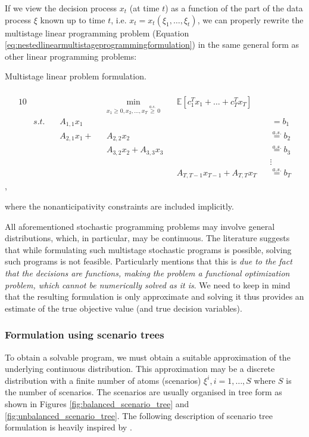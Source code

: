 If we view the decision process $x_t$ (at time $t$) as a function of the part of the data process $\xi$ known up to time $t$, i.e. $x_t=x_t(\xi_1,\dots,\xi_t)$, we can properly rewrite the multistage linear programming problem (Equation \ref{eq:nestedlinearmultistageprogrammingformulation}) in the same general form as other linear programming problems:
\begin{defn}
{Multistage linear problem formulation. \\ \cite[Ch. 1, p. 22]{stochasticprogrammingbible}} \\
\footnotesize
\begin{alignat}{10}
\label{eq:staircaselinearprogrammingformulation}
& &&  && \underset{x_1 \geq 0, x_2,\dots,x_T \overset{a.s.}{\geq} 0}{\mathrm{min}}  &&  \mathbb{E}\left[ c_1^Tx_1 + \dots +  c_T^Tx_T \right] && \\
& s.t. \, && A_{1,1}x_1 && && && \,=b_1 \nonumber \\
& && A_{2,1}x_1 +  && A_{2,2}x_2 && && \overset{a.s.}{=}b_2 \nonumber \\
& && && A_{3,2}x_2  +  A_{3,3}x_3 && && \overset{a.s.}{=}b_3 \nonumber \\
& && && && && \vdots \nonumber \\
& && && && A_{T,T-1}x_{T-1}  +  A_{T,T}x_T  && \overset{a.s.}{=}b_T \nonumber
\end{alignat}
\normalsize
,
\end{defn}
where the nonanticipativity constraints are included implicitly.

All aforementioned stochastic programming problems may involve general distributions, which, in particular, may be continuous. The literature suggests that while formulating such multistage stochastic programs is possible, solving such programs is not feasible. Particularly \cite{pflugscenariotreegeneration} mentions that this is \textit{due to the fact that the decisions are functions, making the problem a functional optimization problem, which cannot be numerically solved as it is}. We need to keep in mind that the resulting formulation is only approximate and solving it thus provides an estimate of the true objective value (and true decision variables).
\subsubsection{Formulation using scenario trees}
To obtain a solvable program, we must obtain a suitable approximation of the underlying continuous distribution. This approximation may be a discrete distribution with a finite number of atoms (scenarios) $\xi^i, i=1,\dots,S$ where $S$ is the number of scenarios. The scenarios are usually organised in tree form as shown in Figures \ref{fig:balanced_scenario_tree} and \ref{fig:unbalanced_scenario_tree}. The following description of scenario tree formulation is heavily inspired by \cite[Section 2]{dupacova_scenarios_for_multistage_stochastic_programs}.

